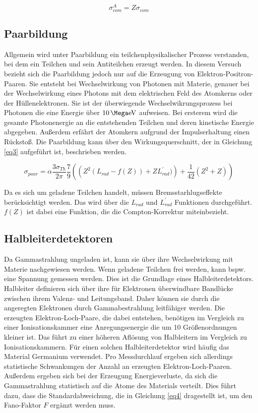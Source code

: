 \begin{equation}
    \sigma^A_{com} = Z \sigma_{com}
\end{equation}

\subsection{Paarbildung}
Allgemein wird unter Paarbildung ein teilchenphysikalischer Prozess verstanden, bei dem 
ein Teilchen und sein Antiteilchen erzeugt werden. In diesem Versuch bezieht sich die 
Paarbildung jedoch nur auf die Erzeugung von Elektron-Positron-Paaren. 
Sie entsteht bei Wechselwirkung von Photonen mit Materie, genauer bei der 
Wechselwirkung eines Photons mit dem elektrischen Feld des Atomkerns oder der 
Hüllenelektronen. 
Sie ist der überwiegende Wechselwikrungsprozess bei Photonen die eine Energie
über $\SI{10}{\Mega\electronvolt}$ aufweisen.
Bei ersterem wird die gesamte Photonenergie an die 
entstehenden Teilchen und deren kinetische Energie abgegeben. Außerdem erfährt 
der Atomkern aufgrund der Impulserhaltung einen Rückstoß.
Die Paarbildung kann über den 
Wirkungsquerschnitt, der in Gleichung \ref{eq3} aufgeführt ist, beschrieben werden.

\begin{equation}
    \sigma_{paar} = \alpha \frac{3 \sigma_{Th}}{2 \pi} \frac{7}{9} \left( \left( Z^2 (L_{rad} - f(Z)) + Z L^'_{rad}) \right) + \frac{1}{42} \left(Z^2 + Z \right) \right)
    \label{eq3}
\end{equation}

Da es sich um geladene Teilchen handelt, müssen Bremsstarhlugseffekte berücksichtigt 
werden. Das wird über die $L_{rad}$ und $L^'_{rad}$ Funktionen durchgeführt. 
$f(Z)$ ist dabei eine Funktion, die die Compton-Korrektur miteinbezieht.



\subsection{Halbleiterdetektoren}
Da Gammastrahlung ungeladen ist, kann sie über ihre Wechselwirkung mit Materie 
nachgewiesen werden. Wenn geladene Teilchen frei werden, kann bspw. eine 
Spannung gemessen werden. Dies ist die Grundlage eines Halbleiterdetektors.
Halbleiter definieren sich über ihre für Elektronen überwindbare 
Bandlücke zwischen ihrem Valenz- und Leitungsband. Daher können sie durch die 
angeregten Elektronen durch Gammabestrahlung leitfähiger werden. 
Die erzeugten Elektron-Loch-Paare, die dabei entstehen, benötigen im Vergleich zu einer 
Ionisationskammer eine Anregungsenergie die um 10 Größenordnungen kleiner ist. 
Das führt zu einer höheren Aflösung von Halbleitern im Vergleich zu Ionisationskammern.
Für einen solchen Halbleiterdetektor wird häufig das Material Germanium verwendet.
Pro Messdurchlauf ergeben sich allerdings statistische Schwankungen der Anzahl an 
erzeugten Elektron-Loch-Paaren. Außerdem ergeben sich bei der Erzeugung Energieverluste,
da sich die Gammastrahlung statistisch auf die Atome des Materials verteilt.
Dies führt dazu, dass die Standardabweichung, die in Gleichung \ref{eq4} dragestellt ist,
um den Fano-Faktor $F$ ergänzt werden muss.

